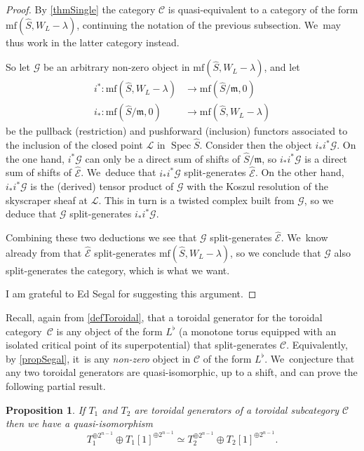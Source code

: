 \documentclass[JEP,XML,SOM,Unicode,NoEqCountersInSection,NoFloatCountersInSection,published]{cedram}
\newtheorem{proposition}[theorem]{Proposition}
\theoremstyle{definition}
\newcommand{\LL}{L^\flat}
\newcommand{\hatS}{\widehat{S}}
\newcommand{\hatE}{\widehat{\calE}}
\newcommand{\calC}{\mathcal{C}}
\newcommand{\calE}{\mathcal{E}}
\newcommand{\calG}{\mathcal{G}}
\newcommand{\calL}{\mathcal{L}}
\newcommand{\m}{\mathfrak{m}}
\newcommand{\mf}{\mathrm{mf}}
\newcommand{\Spec}{\operatorname{Spec}}
\begin{document}
\begin{proof}
By \cref{thmSingle} the category $\calC$ is quasi-equivalent to a category of the form $\mf(\hatS, W_L - \lambda)$, continuing the notation of the previous subsection. We~may thus work in the latter category instead.

So let $\calG$ be an arbitrary non-zero object in $\mf(\hatS, W_L - \lambda)$, and let\vspace*{-3pt}
\begin{align*}
i^* : \mf(\hatS, W_L - \lambda) &\to \mf(\hatS / \m, 0)
\\ i_* : \mf(\hatS/\m, 0) &\to \mf(\hatS, W_L - \lambda)
\end{align*}
be the pullback (restriction) and pushforward (inclusion) functors associated to the inclusion of the closed point $\calL$ in $\Spec \hatS$. Consider then the object $i_*i^* \calG$. On the one hand, $i^*\calG$ can only be a direct sum of shifts of $\hatS/\m$, so $i_*i^*\calG$ is a direct sum of shifts of $\hatE$. We~deduce that $i_*i^*\calG$ split-generates $\hatE$. On the other hand, $i_*i^*\calG$ is the (derived) tensor product of $\calG$ with the Koszul resolution of the skyscraper sheaf at $\calL$. This in turn is a twisted complex built from $\calG$, so we deduce that $\calG$ split-generates $i_*i^*\calG$.

Combining these two deductions we see that $\calG$ split-generates $\hatE$. We~know already from \cite[Cor.\,5.3]{Dyckerhoff} that $\hatE$ split-generates $\mf(\hatS, W_L - \lambda)$, so we conclude that $\calG$ also split-generates the category, which is what we want.\qedhere

I am grateful to Ed Segal for suggesting this argument.
\end{proof}

Recall, again from \cref{defToroidal}, that a toroidal generator for the toroidal category~$\calC$ is any object of the form $\LL$ (\ie a monotone torus equipped with an isolated critical point of its superpotential) that split-generates $\calC$. Equivalently, by \cref{propSegal}, it~is any \emph{non-zero} object in $\calC$ of the form $\LL$. We~conjecture that any two toroidal generators are quasi-isomorphic, up to a shift, and can prove the following partial result.

\begin{proposition}
\label{propToriIsomc}
If $T_1$ and $T_2$ are toroidal generators of a toroidal subcategory $\calC$ then we have a quasi-isomorphism
\[
T_1^{\oplus 2^{n-1}} \oplus T_1[1]^{\oplus 2^{n-1}} \simeq T_2^{\oplus 2^{n-1}} \oplus T_2[1]^{\oplus 2^{n-1}}.
\]
\end{proposition}
\end{document}
